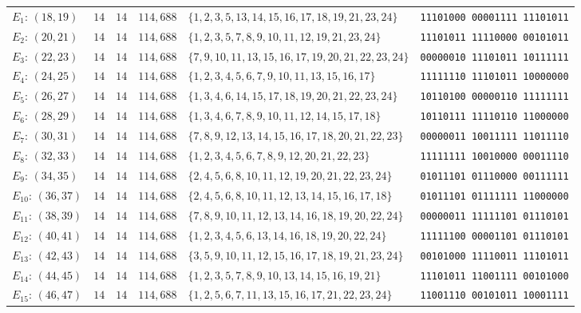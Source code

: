\documentclass[aps,pra,reprint,superscriptaddress,longbibliography,nofootinbib,floatfix,10pt]{revtex4-2}
\theoremstyle{definition}
\begin{document}
\begin{longtable}{lrrrlc}
$E_{1}:\,(18,19)$ & $14$ & $14$ & $114{,}688$ & $\{1,2,3,5,13,14,15,16,17,18,19,21,23,24\}$ & \texttt{11101000\,00001111\,11101011} \\
$E_{2}:\,(20,21)$ & $14$ & $14$ & $114{,}688$ & $\{1,2,3,5,7,8,9,10,11,12,19,21,23,24\}$ & \texttt{11101011\,11110000\,00101011} \\
$E_{3}:\,(22,23)$ & $14$ & $14$ & $114{,}688$ & $\{7,9,10,11,13,15,16,17,19,20,21,22,23,24\}$ & \texttt{00000010\,11101011\,10111111} \\
$E_{4}:\,(24,25)$ & $14$ & $14$ & $114{,}688$ & $\{1,2,3,4,5,6,7,9,10,11,13,15,16,17\}$ & \texttt{11111110\,11101011\,10000000} \\
$E_{5}:\,(26,27)$ & $14$ & $14$ & $114{,}688$ & $\{1,3,4,6,14,15,17,18,19,20,21,22,23,24\}$ & \texttt{10110100\,00000110\,11111111} \\
$E_{6}:\,(28,29)$ & $14$ & $14$ & $114{,}688$ & $\{1,3,4,6,7,8,9,10,11,12,14,15,17,18\}$ & \texttt{10110111\,11110110\,11000000} \\
$E_{7}:\,(30,31)$ & $14$ & $14$ & $114{,}688$ & $\{7,8,9,12,13,14,15,16,17,18,20,21,22,23\}$ & \texttt{00000011\,10011111\,11011110} \\
$E_{8}:\,(32,33)$ & $14$ & $14$ & $114{,}688$ & $\{1,2,3,4,5,6,7,8,9,12,20,21,22,23\}$ & \texttt{11111111\,10010000\,00011110} \\
$E_{9}:\,(34,35)$ & $14$ & $14$ & $114{,}688$ & $\{2,4,5,6,8,10,11,12,19,20,21,22,23,24\}$ & \texttt{01011101\,01110000\,00111111} \\
$E_{10}:\,(36,37)$ & $14$ & $14$ & $114{,}688$ & $\{2,4,5,6,8,10,11,12,13,14,15,16,17,18\}$ & \texttt{01011101\,01111111\,11000000} \\
$E_{11}:\,(38,39)$ & $14$ & $14$ & $114{,}688$ & $\{7,8,9,10,11,12,13,14,16,18,19,20,22,24\}$ & \texttt{00000011\,11111101\,01110101} \\
$E_{12}:\,(40,41)$ & $14$ & $14$ & $114{,}688$ & $\{1,2,3,4,5,6,13,14,16,18,19,20,22,24\}$ & \texttt{11111100\,00001101\,01110101} \\
$E_{13}:\,(42,43)$ & $14$ & $14$ & $114{,}688$ & $\{3,5,9,10,11,12,15,16,17,18,19,21,23,24\}$ & \texttt{00101000\,11110011\,11101011} \\
$E_{14}:\,(44,45)$ & $14$ & $14$ & $114{,}688$ & $\{1,2,3,5,7,8,9,10,13,14,15,16,19,21\}$ & \texttt{11101011\,11001111\,00101000} \\
$E_{15}:\,(46,47)$ & $14$ & $14$ & $114{,}688$ & $\{1,2,5,6,7,11,13,15,16,17,21,22,23,24\}$ & \texttt{11001110\,00101011\,10001111} \\

\end{longtable}
\end{document}
